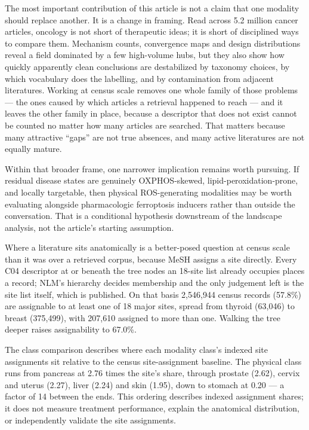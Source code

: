 \documentclass[11pt,twoside,openright]{report}
\begin{document}
The most important contribution of this article is not a claim that one modality should replace another. It is a change in framing. Read across 5.2 million cancer articles, oncology is not short of therapeutic ideas; it is short of disciplined ways to compare them. Mechanism counts, convergence maps and design distributions reveal a field dominated by a few high-volume hubs, but they also show how quickly apparently clean conclusions are destabilized by taxonomy choices, by which vocabulary does the labelling, and by contamination from adjacent literatures. Working at census scale removes one whole family of those problems --- the ones caused by which articles a retrieval happened to reach --- and it leaves the other family in place, because a descriptor that does not exist cannot be counted no matter how many articles are searched. That matters because many attractive “gaps” are not true absences, and many active literatures are not equally mature.

Within that broader frame, one narrower implication remains worth pursuing. If residual disease states are genuinely OXPHOS-skewed, lipid-peroxidation-prone, and locally targetable, then physical ROS-generating modalities may be worth evaluating alongside pharmacologic ferroptosis inducers rather than outside the conversation. That is a conditional hypothesis downstream of the landscape analysis, not the article's starting assumption.

Where a literature sits anatomically is a better-posed question at census scale than it was over a retrieved corpus, because MeSH assigns a site directly. Every C04 descriptor at or beneath the tree nodes an 18-site list already occupies places a record; NLM's hierarchy decides membership and the only judgement left is the site list itself, which is published. On that basis 2,546,944 census records (57.8\%) are assignable to at least one of 18 major sites, spread from thyroid (63,046) to breast (375,499), with 207,610 assigned to more than one. Walking the tree deeper raises assignability to 67.0\%.

The class comparison describes where each modality class's indexed site assignments sit relative to the census site-assignment baseline. The physical class runs from pancreas at 2.76 times the site's share, through prostate (2.62), cervix and uterus (2.27), liver (2.24) and skin (1.95), down to stomach at 0.20 --- a factor of 14 between the ends. This ordering describes indexed assignment shares; it does not measure treatment performance, explain the anatomical distribution, or independently validate the site assignments.
\end{document}
